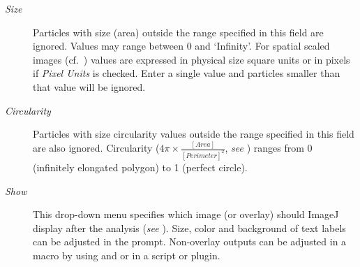 \begin{description}
\item [{\emph{Size}}] Particles with size (area) outside the range specified
in this field are ignored. Values may range between 0 and `Infinity'.
For spatial scaled images (cf.\ )
values are expressed in physical size square units or in pixels if
\emph{Pixel Units} is checked. Enter a single value and particles
smaller than that value will be ignored. 
\item [{\emph{Circularity}}] Particles with size circularity values outside
the range specified in this field are also ignored. Circularity ($4\pi\times\frac{[Area]}{[Perimeter]^{2}}$,
\emph{see} ) ranges
from 0 (infinitely elongated polygon) to 1 (perfect circle).
\item [{\emph{Show}}] This drop-down menu specifies which image (or overlay)
should ImageJ display after the analysis (\emph{see} ).
Size, color and background of text labels can be adjusted in the 
prompt. Non-overlay outputs can be adjusted in a macro by using {\small {}} and {\small {} } or {\small {}}
{\small {}} in
a script or plugin.


\end{description}
